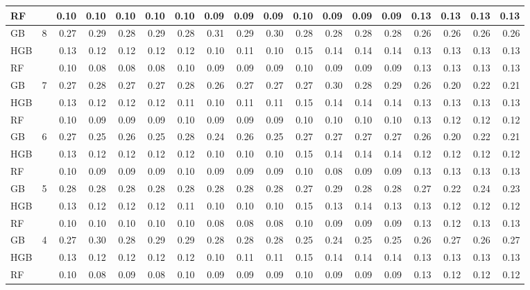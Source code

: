 \documentclass{IEEEtran}
\begin{document}
\begin{table}[th]
\begin{adjustbox}{width=\textwidth}
\begin{tabular}{| l | l | rrrr | rrrr | rrrr | rrrr |}
RF &   & 0.10 & 0.10 & 0.10 & 0.10 & 0.10 & 0.09 & 0.09 & 0.09 & 0.10 & 0.09 & 0.09 & 0.09 & 0.13 & 0.13 & 0.13 & 0.13 \\ \hline
GB & \multirow{3}{*}{8} & 0.27 & 0.29 & 0.28 & 0.29 & 0.28 & 0.31 & 0.29 & 0.30 & 0.28 & 0.28 & 0.28 & 0.28 & 0.26 & 0.26 & 0.26 & 0.26 \\
HGB &   & 0.13 & 0.12 & 0.12 & 0.12 & 0.12 & 0.10 & 0.11 & 0.10 & 0.15 & 0.14 & 0.14 & 0.14 & 0.13 & 0.13 & 0.13 & 0.13 \\
RF &   & 0.10 & 0.08 & 0.08 & 0.08 & 0.10 & 0.09 & 0.09 & 0.09 & 0.10 & 0.09 & 0.09 & 0.09 & 0.13 & 0.13 & 0.13 & 0.13 \\ \hline
GB & \multirow{3}{*}{7} & 0.27 & 0.28 & 0.27 & 0.27 & 0.28 & 0.26 & 0.27 & 0.27 & 0.27 & 0.30 & 0.28 & 0.29 & 0.26 & 0.20 & 0.22 & 0.21 \\
HGB &   & 0.13 & 0.12 & 0.12 & 0.12 & 0.11 & 0.10 & 0.11 & 0.11 & 0.15 & 0.14 & 0.14 & 0.14 & 0.13 & 0.13 & 0.13 & 0.13 \\
RF &   & 0.10 & 0.09 & 0.09 & 0.09 & 0.10 & 0.09 & 0.09 & 0.09 & 0.10 & 0.10 & 0.10 & 0.10 & 0.13 & 0.12 & 0.12 & 0.12 \\ \hline
GB & \multirow{3}{*}{6} & 0.27 & 0.25 & 0.26 & 0.25 & 0.28 & 0.24 & 0.26 & 0.25 & 0.27 & 0.27 & 0.27 & 0.27 & 0.26 & 0.20 & 0.22 & 0.21 \\
HGB &   & 0.13 & 0.12 & 0.12 & 0.12 & 0.12 & 0.10 & 0.10 & 0.10 & 0.15 & 0.14 & 0.14 & 0.14 & 0.12 & 0.12 & 0.12 & 0.12 \\
RF &   & 0.10 & 0.09 & 0.09 & 0.09 & 0.10 & 0.09 & 0.09 & 0.09 & 0.10 & 0.08 & 0.09 & 0.09 & 0.13 & 0.13 & 0.13 & 0.13 \\ \hline
GB & \multirow{3}{*}{5} & 0.28 & 0.28 & 0.28 & 0.28 & 0.28 & 0.28 & 0.28 & 0.28 & 0.27 & 0.29 & 0.28 & 0.28 & 0.27 & 0.22 & 0.24 & 0.23 \\
HGB &   & 0.13 & 0.12 & 0.12 & 0.12 & 0.11 & 0.10 & 0.10 & 0.10 & 0.15 & 0.13 & 0.14 & 0.13 & 0.13 & 0.12 & 0.12 & 0.12 \\
RF &   & 0.10 & 0.10 & 0.10 & 0.10 & 0.10 & 0.08 & 0.08 & 0.08 & 0.10 & 0.09 & 0.09 & 0.09 & 0.13 & 0.12 & 0.13 & 0.13 \\ \hline
GB & \multirow{3}{*}{4} & 0.27 & 0.30 & 0.28 & 0.29 & 0.29 & 0.28 & 0.28 & 0.28 & 0.25 & 0.24 & 0.25 & 0.25 & 0.26 & 0.27 & 0.26 & 0.27 \\
HGB &   & 0.13 & 0.12 & 0.12 & 0.12 & 0.12 & 0.10 & 0.11 & 0.11 & 0.15 & 0.14 & 0.14 & 0.14 & 0.13 & 0.13 & 0.13 & 0.13 \\
RF &   & 0.10 & 0.08 & 0.09 & 0.08 & 0.10 & 0.09 & 0.09 & 0.09 & 0.10 & 0.09 & 0.09 & 0.09 & 0.13 & 0.12 & 0.12 & 0.12 \\ \hline

\end{tabular}
\end{adjustbox}
\end{table}
\end{document}
